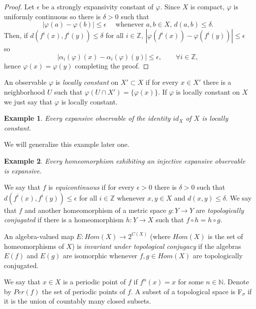 \documentclass[11pt,letterpaper]{amsart}
\newtheorem{example}{Example}
\begin{document}
\begin{proof}
Let $\epsilon$ be a strongly expansivity constant of $\varphi$.
Since $X$ is compact, $\varphi$ is uniformly continuous so there is $\delta>0$ such that
$$
|\varphi(a)-\varphi(b)|\leq\epsilon
\quad\mbox{ whenever }
a,b\in X,\, d(a,b)\leq\delta.
$$
Then, if $d(f^i(x),f^i(y))\leq\delta$ for all $i\in\mathbb{Z}$, $|\varphi(f^i(x))-\varphi(f^i(y))|\leq\epsilon$ so
$$
|\alpha_i(\varphi)(x)-\alpha_i(\varphi)(y)|\leq\epsilon,\quad\quad\forall i\in\mathbb{Z},$$
hence $\varphi(x)=\varphi(y)$
completing the proof.
\end{proof}

An observable $\varphi$ is {\em locally constant} on $X'\subset X$ if for every $x\in X'$ there is a neighborhood $U$ such that $\varphi(U\cap X')=\{\varphi(x)\}$. If $\varphi$ is locally constant on $X$ we just say that $\varphi$ is locally constant.

\begin{example}
Every expansive observable of the identity $id_X$ of $X$ is locally constant.
\end{example}

We will generalize this example later one.



\begin{example}
Every homeomorphism exhibiting an injective expansive observable is expansive.
\end{example}

We say that $f$ is {\em equicontinuous} if for every $\epsilon>0$ there is $\delta>0$ such that $d(f^i(x),f^i(y))\leq\epsilon$ for all $i\in\mathbb{Z}$ whenever $x,y\in X$ and $d(x,y)\leq \delta$.
We say that $f$ and another homeomorphism of a metric space $g:Y\to Y$ are {\em topologically conjugated}
if there is a homeomorphism $h:Y\to X$ such that $f\circ h=h\circ g$.

An algebra-valued map $E:Hom(X)\to 2^{C(X)}$ (where $Hom(X)$ is the set of homeomorphisms of $X$) is {\em invariant under topological conjugacy} if
the algebras $E(f)$ and $E(g)$ are isomorphic whenever $f,g\in Hom(X)$ are topologically conjugated.

We say that $x\in X$ is a periodic point of $f$ if $f^n(x)=x$ for some $n\in\mathbb{N}$.
Denote by $Per(f)$ the set of periodic points of $f$.
A subset of a topological space is F$_\sigma$ if it is the union of countably many closed subsets.
\end{document}
